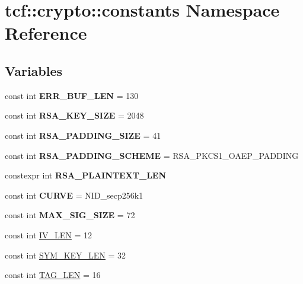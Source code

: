 \hypertarget{namespacetcf_1_1crypto_1_1constants}{}\section{tcf\+:\+:crypto\+:\+:constants Namespace Reference}
\label{namespacetcf_1_1crypto_1_1constants}
\subsection*{Variables}
\begin{DoxyCompactItemize}
\item 
\mbox{\label{namespacetcf_1_1crypto_1_1constants_a4dc6709427a1b02e9c0e29c39a5176ef}} 
const int {\bfseries E\+R\+R\+\_\+\+B\+U\+F\+\_\+\+L\+EN} = 130
\item 
\mbox{\label{namespacetcf_1_1crypto_1_1constants_ae6874400d2a5dee9995c3d43e0a382ed}} 
const int {\bfseries R\+S\+A\+\_\+\+K\+E\+Y\+\_\+\+S\+I\+ZE} = 2048
\item 
\mbox{\label{namespacetcf_1_1crypto_1_1constants_a41ca65e6cf1bd204e3121aaf38d5d6e9}} 
const int {\bfseries R\+S\+A\+\_\+\+P\+A\+D\+D\+I\+N\+G\+\_\+\+S\+I\+ZE} = 41
\item 
\mbox{\label{namespacetcf_1_1crypto_1_1constants_a22a6df81933e7d46c28d187c8e738047}} 
const int {\bfseries R\+S\+A\+\_\+\+P\+A\+D\+D\+I\+N\+G\+\_\+\+S\+C\+H\+E\+ME} = R\+S\+A\+\_\+\+P\+K\+C\+S1\+\_\+\+O\+A\+E\+P\+\_\+\+P\+A\+D\+D\+I\+NG
\item 
constexpr int {\bfseries R\+S\+A\+\_\+\+P\+L\+A\+I\+N\+T\+E\+X\+T\+\_\+\+L\+EN}
\item 
\mbox{\label{namespacetcf_1_1crypto_1_1constants_aca0fae7e8a5040ae2f4a5aea9e333400}} 
const int {\bfseries C\+U\+R\+VE} = N\+I\+D\+\_\+secp256k1
\item 
\mbox{\label{namespacetcf_1_1crypto_1_1constants_a8ac4b8b27ff2cfb9df3e292c16c837ec}} 
const int {\bfseries M\+A\+X\+\_\+\+S\+I\+G\+\_\+\+S\+I\+ZE} = 72
\item 
const int \hyperlink{namespacetcf_1_1crypto_1_1constants_af5004682af494a4068f02c606f68783f}{I\+V\+\_\+\+L\+EN} = 12
\item 
const int \hyperlink{namespacetcf_1_1crypto_1_1constants_a4454a3086f04ccff92ea8723610c363f}{S\+Y\+M\+\_\+\+K\+E\+Y\+\_\+\+L\+EN} = 32
\item 
const int \hyperlink{namespacetcf_1_1crypto_1_1constants_a39cb6ae8f3a122069bb263187339e4ee}{T\+A\+G\+\_\+\+L\+EN} = 16
\end{DoxyCompactItemize}


